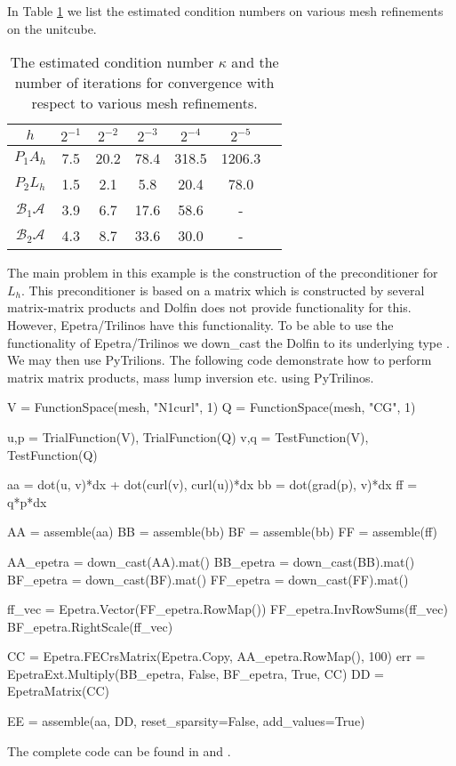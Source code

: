 In Table \ref{table:hodge} we list the estimated condition numbers on various mesh refinements
on the unitcube. 
\begin{table}
\begin{center}
\begin{tabular}{|c||c|c|c|c|c|c|}
\hline
$h$ & $2^{-1}$ & $2^{-2}$ & $2^{-3}$ & $2^{-4}$  & $2^{-5}$ \\ \hline 
$ P_1 A_h$ & 7.5 & 20.2 & 78.4 & 318.5 & 1206.3 \\ \hline
$ P_2 L_h$ & 1.5 & 2.1  & 5.8  & 20.4 & 78.0 \\ \hline
$\mathcal{B}_1 \mathcal{A}$ & 3.9 & 6.7 & 17.6 & 58.6 & - \\ \hline
$\mathcal{B}_2 \mathcal{A}$ & 4.3 & 8.7 & 33.6 & 30.0 & - \\ \hline
\end{tabular}
\caption{The estimated condition number $\kappa$ and the number of iterations for 
  convergence with respect to various mesh refinements.}  \label{table:hodge}
\end{center}
\end{table}

The main problem in this example is the construction of the preconditioner
for $L_h$. This preconditioner is based on a matrix which is constructed by 
several matrix-matrix products and Dolfin does not provide functionality for
this. However, Epetra/Trilinos have this functionality. To be able 
to use the functionality of Epetra/Trilinos we down\_cast the Dolfin 
to its underlying type . We may then use PyTrilions. 
The following code demonstrate how to perform matrix matrix products, mass lump inversion  etc. using 
PyTrilinos. 
\begin{code}
V = FunctionSpace(mesh, "N1curl", 1)
Q = FunctionSpace(mesh, "CG", 1)

u,p = TrialFunction(V), TrialFunction(Q)
v,q = TestFunction(V), TestFunction(Q)

aa = dot(u, v)*dx + dot(curl(v), curl(u))*dx   
bb = dot(grad(p), v)*dx  
ff = q*p*dx  

AA = assemble(aa) 
BB = assemble(bb) 
BF = assemble(bb) 
FF = assemble(ff)

AA_epetra = down_cast(AA).mat()
BB_epetra = down_cast(BB).mat()
BF_epetra = down_cast(BF).mat()
FF_epetra = down_cast(FF).mat()

ff_vec = Epetra.Vector(FF_epetra.RowMap())
FF_epetra.InvRowSums(ff_vec)
BF_epetra.RightScale(ff_vec)

CC = Epetra.FECrsMatrix(Epetra.Copy, AA_epetra.RowMap(), 100)
err = EpetraExt.Multiply(BB_epetra, False, BF_epetra, True, CC) 
DD = EpetraMatrix(CC)

EE = assemble(aa, DD, reset_sparsity=False, add_values=True)
\end{code}
The complete code can be found in  and . 


